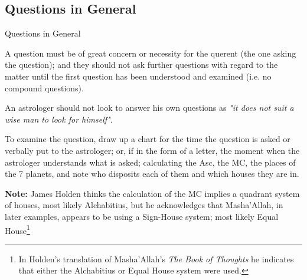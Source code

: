 \subsection{Questions in General}
\begin{frame}[t]{Questions in General}

A question must be of great concern or necessity for the querent (the one asking the question); and they should not ask further questions with regard to the matter until the first question has been understood and examined (i.e. no compound questions).

An astrologer should not look to answer his own questions as \textsl{"it does not suit a wise man to look for himself"}. 

To examine the question, draw up a chart for the time the question is asked or verbally put to the astrologer; or, if in the form of a letter, the moment when the astrologer understands what is asked; calculating the Asc, the MC, the places of the 7 planets, and note who disposits each of them and which houses they are in.
\vspace{0.5cm}
\begin{mdframed}[backgroundcolor=gray!5, rightmargin=2em, leftmargin=2em]
\textbf{Note:} James Holden thinks the calculation of the MC implies a quadrant system of houses, most likely Alchabitius, but he acknowledges that Masha'Allah, in later examples, appears to be using a Sign-House system; most likely Equal House\footnote{In Holden's translation of Masha'Allah's \textsl{The Book of Thoughts} he indicates that either the Alchabitius or Equal House system were used.}
\end{mdframed}

\end{frame}